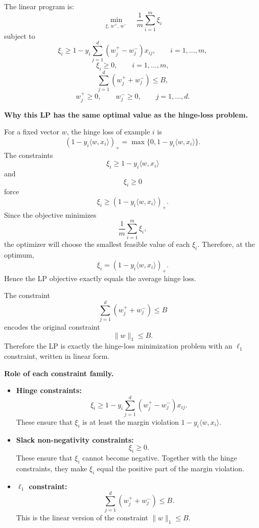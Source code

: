 \documentclass[11pt]{article}
\begin{document}
\begin{enumerate}
\begin{solutionbox}
    The linear program is:
    \[
      \min_{\xi,\,w^+,\,w^-}
      \quad
      \frac{1}{m}\sum_{i=1}^m \xi_i
    \]
    subject to
    \[
      \xi_i
      \ge
      1-y_i\sum_{j=1}^d (w_j^+-w_j^-)x_{ij},
      \qquad i=1,\ldots,m,
    \]
    \[
      \xi_i\ge0,
      \qquad i=1,\ldots,m,
    \]
    \[
      \sum_{j=1}^d (w_j^++w_j^-)\le B,
    \]
    \[
      w_j^+\ge0,
      \qquad
      w_j^-\ge0,
      \qquad j=1,\ldots,d.
    \]

    \medskip

    \textbf{Why this LP has the same optimal value as the hinge-loss problem.}

    For a fixed vector $w$, the hinge loss of example $i$ is
    \[
    (1-y_i\langle w,x_i\rangle)_+
    =
    \max\{0,1-y_i\langle w,x_i\rangle\}.
    \]
    The constraints
    \[
    \xi_i\ge 1-y_i\langle w,x_i\rangle
    \]
    and
    \[
    \xi_i\ge0
    \]
    force
    \[
    \xi_i\ge (1-y_i\langle w,x_i\rangle)_+.
    \]
    Since the objective minimizes
    \[
    \frac1m\sum_{i=1}^m \xi_i,
    \]
    the optimizer will choose the smallest feasible value of each $\xi_i$. Therefore, at the
    optimum,
    \[
    \xi_i=(1-y_i\langle w,x_i\rangle)_+.
    \]
    Hence the LP objective exactly equals the average hinge loss.

    The constraint
    \[
    \sum_{j=1}^d(w_j^++w_j^-)\le B
    \]
    encodes the original constraint
    \[
    \|w\|_1\le B.
    \]
    Therefore the LP is exactly the hinge-loss minimization problem with an $\ell_1$ constraint,
    written in linear form.

    \medskip

    \textbf{Role of each constraint family.}

    \begin{itemize}[leftmargin=2em]
      \item \textbf{Hinge constraints:}
      \[
      \xi_i
      \ge
      1-y_i\sum_{j=1}^d (w_j^+-w_j^-)x_{ij}.
      \]
      These ensure that $\xi_i$ is at least the margin violation
      $1-y_i\langle w,x_i\rangle$.

      \item \textbf{Slack non-negativity constraints:}
      \[
      \xi_i\ge0.
      \]
      These ensure that $\xi_i$ cannot become negative. Together with the hinge constraints,
      they make $\xi_i$ equal the positive part of the margin violation.

      \item \textbf{$\ell_1$ constraint:}
      \[
      \sum_{j=1}^d(w_j^++w_j^-)\le B.
      \]
      This is the linear version of the constraint $\|w\|_1\le B$.


\end{itemize}
\end{solutionbox}
\end{enumerate}
\end{document}
